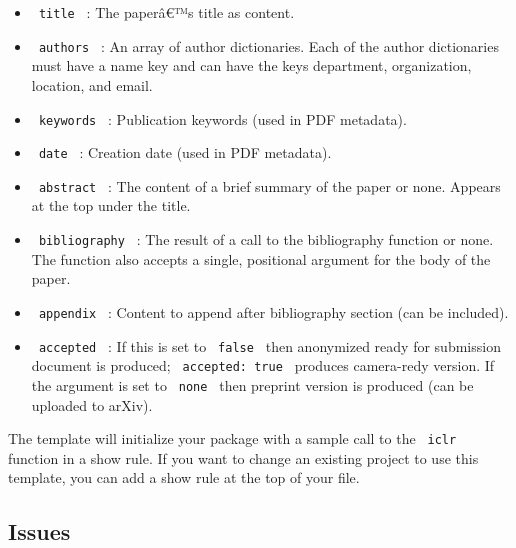 \begin{itemize}
\item
  \texttt{\ title\ } : The paperâ€™s title as content.
\item
  \texttt{\ authors\ } : An array of author dictionaries. Each of the
  author dictionaries must have a name key and can have the keys
  department, organization, location, and email.

\begin{Shaded}
\begin{Highlighting}[]
\NormalTok{  (}
\NormalTok{  ),}
\NormalTok{)}
\end{Highlighting}
\end{Shaded}
\item
  \texttt{\ keywords\ } : Publication keywords (used in PDF metadata).
\item
  \texttt{\ date\ } : Creation date (used in PDF metadata).
\item
  \texttt{\ abstract\ } : The content of a brief summary of the paper or
  none. Appears at the top under the title.
\item
  \texttt{\ bibliography\ } : The result of a call to the bibliography
  function or none. The function also accepts a single, positional
  argument for the body of the paper.
\item
  \texttt{\ appendix\ } : Content to append after bibliography section
  (can be included).
\item
  \texttt{\ accepted\ } : If this is set to \texttt{\ false\ } then
  anonymized ready for submission document is produced;
  \texttt{\ accepted:\ true\ } produces camera-redy version. If the
  argument is set to \texttt{\ none\ } then preprint version is produced
  (can be uploaded to arXiv).
\end{itemize}

The template will initialize your package with a sample call to the
\texttt{\ iclr\ } function in a show rule. If you want to change an
existing project to use this template, you can add a show rule at the
top of your file.

\subsection{Issues}\label{issues}

